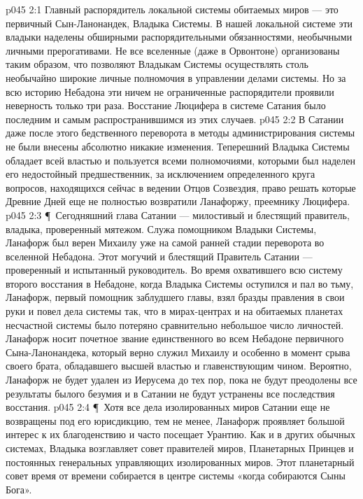 \vs p045 2:1 Главный распорядитель локальной системы обитаемых миров --- это первичный Сын\hyp{}Ланонандек, Владыка Системы. В нашей локальной системе эти владыки наделены обширными распорядительными обязанностями, необычными личными прерогативами. Не все вселенные (даже в Орвонтоне) организованы таким образом, что позволяют Владыкам Системы осуществлять столь необычайно широкие личные полномочия в управлении делами системы. Но за всю историю Небадона эти ничем не ограниченные распорядители проявили неверность только три раза. Восстание Люцифера в системе Сатания было последним и самым распространившимся из этих случаев.
\vs p045 2:2 В Сатании даже после этого бедственного переворота в методы администрирования системы не были внесены абсолютно никакие изменения. Теперешний Владыка Системы обладает всей властью и пользуется всеми полномочиями, которыми был наделен его недостойный предшественник, за исключением определенного круга вопросов, находящихся сейчас в ведении Отцов Созвездия, право решать которые Древние Дней еще не полностью возвратили Ланафоржу, преемнику Люцифера.
\vs p045 2:3 \P\ Сегодняшний глава Сатании --- милостивый и блестящий правитель, владыка, проверенный мятежом. Служа помощником Владыки Системы, Ланафорж был верен Михаилу уже на самой ранней стадии переворота во вселенной Небадона. Этот могучий и блестящий Правитель Сатании --- проверенный и испытанный руководитель. Во время охватившего всю систему второго восстания в Небадоне, когда Владыка Системы оступился и пал во тьму, Ланафорж, первый помощник заблудшего главы, взял бразды правления в свои руки и повел дела системы так, что в мирах\hyp{}центрах и на обитаемых планетах несчастной системы было потеряно сравнительно небольшое число личностей. Ланафорж носит почетное звание единственного во всем Небадоне первичного Сына\hyp{}Ланонандека, который верно служил Михаилу и особенно в момент срыва своего брата, обладавшего высшей властью и главенствующим чином. Вероятно, Ланафорж не будет удален из Иерусема до тех пор, пока не будут преодолены все результаты былого безумия и в Сатании не будут устранены все последствия восстания.
\vs p045 2:4 \P\ Хотя все дела изолированных миров Сатании еще не возвращены под его юрисдикцию, тем не менее, Ланафорж проявляет большой интерес к их благоденствию и часто посещает Урантию. Как и в других обычных системах, Владыка возглавляет совет правителей миров, Планетарных Принцев и постоянных генеральных управляющих изолированных миров. Этот планетарный совет время от времени собирается в центре системы «когда собираются Сыны Бога».
